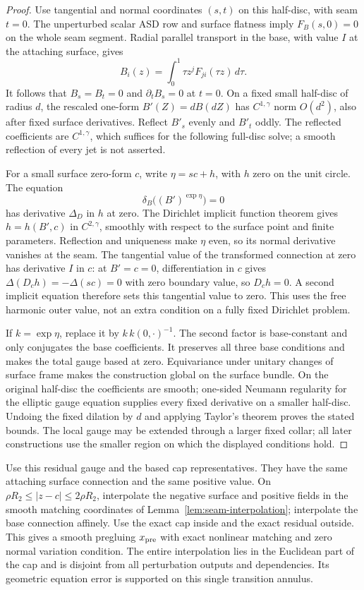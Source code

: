 \documentclass[11pt]{amsart}
\theoremstyle{definition}
\theoremstyle{remark}
\theoremstyle{plain}
\begin{document}
\begin{proof}
Use tangential and normal coordinates $(s,t)$ on this half-disc, with
seam $t=0$. The unperturbed scalar ASD row and surface flatness imply
$F_B(s,0)=0$ on the whole seam segment. Radial parallel transport in
the base, with value $I$ at the attaching surface, gives
\[
                    B_i(z)=\int_0^1\tau z^j F_{ji}(\tau z)\,d\tau.
\]
It follows that $B_s=B_t=0$ and $\partial_tB_s=0$ at $t=0$.
On a fixed small half-disc of radius $d$, the rescaled one-form
$B'(Z)=dB(dZ)$ has $C^{1,\gamma}$ norm $O(d^2)$, also after
fixed surface derivatives. Reflect $B'_s$ evenly and $B'_t$ oddly.
The reflected coefficients are $C^{1,\gamma}$, which suffices for
the following full-disc solve; a smooth reflection of every jet is
not asserted.

For a small surface zero-form $c$, write $\eta=sc+h$, with $h$
zero on the unit circle. The equation
\[
                       \delta_B\bigl((B')^{\exp\eta}\bigr)=0
\]
has derivative $\Delta_D$ in $h$ at zero. The Dirichlet implicit
function theorem gives $h=h(B',c)$ in $C^{2,\gamma}$, smoothly
with respect to the surface point and finite parameters. Reflection
and uniqueness make $\eta$ even, so its normal derivative vanishes
at the seam. The tangential value of the transformed connection at
zero has derivative $I$ in $c$: at $B'=c=0$, differentiation in
$c$ gives $\Delta(D_ch)=-\Delta(sc)=0$ with zero boundary value,
so $D_ch=0$. A second implicit equation therefore sets this tangential
value to zero. This uses the free harmonic outer value, not an extra
condition on a fully fixed Dirichlet problem.

If $k=\exp\eta$, replace it by $k\,k(0,\cdot)^{-1}$. The second
factor is base-constant and only conjugates the base coefficients.
It preserves all three base conditions and makes the total gauge based
at zero. Equivariance under unitary changes of surface frame makes the
construction global on the surface bundle. On the original half-disc
the coefficients are smooth; one-sided Neumann regularity for the
elliptic gauge equation supplies every fixed derivative on a smaller
half-disc. Undoing the fixed dilation by $d$ and applying Taylor's
theorem proves the stated bounds. The local gauge may be extended
through a larger fixed collar; all later constructions use the smaller
region on which the displayed conditions hold.
\end{proof}

Use this residual gauge and the based cap representatives. They have
the same attaching surface connection and the same positive value.
On $\rho R_2\leq|z-c|\leq2\rho R_2$, interpolate the negative
surface and positive fields in the smooth matching coordinates of
Lemma~\ref{lem:seam-interpolation}; interpolate the base connection
affinely. Use the exact cap inside and the exact residual outside.
This gives a smooth pregluing $x_{\rm pre}$ with exact nonlinear
matching and zero normal variation condition. The entire interpolation
lies in the Euclidean part of the cap and is disjoint from all
perturbation outputs and dependencies. Its geometric equation error
is supported on this single transition annulus.
\end{document}
